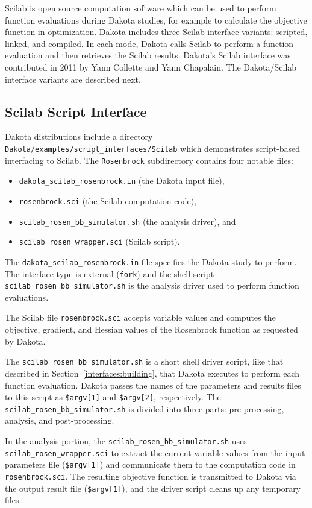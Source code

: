 Scilab is open source computation software which can be used to
perform function evaluations during Dakota studies, for example to
calculate the objective function in optimization. Dakota includes
three Scilab interface variants: scripted, linked, and compiled. In
each mode, Dakota calls Scilab to perform a function evaluation and
then retrieves the Scilab results. Dakota's Scilab interface was
contributed in 2011 by Yann Collette and Yann Chapalain. The
Dakota/Scilab interface variants are described next.

\subsection{Scilab Script Interface} 

Dakota distributions include a directory
\texttt{Dakota/examples/script\_interfaces/Scilab} which demonstrates
script-based interfacing to Scilab. The {\tt Rosenbrock} subdirectory
contains four notable files:
\begin{itemize}
  \item \texttt{dakota\_scilab\_rosenbrock.in} (the Dakota input file),
  \item \texttt{rosenbrock.sci} (the Scilab computation code),
  \item \texttt{scilab\_rosen\_bb\_simulator.sh} (the analysis driver), and
  \item \texttt{scilab\_rosen\_wrapper.sci} (Scilab script).
\end{itemize}

The \texttt{dakota\_scilab\_rosenbrock.in} file specifies the Dakota
study to perform. The interface type is external ({\tt fork}) and the
shell script \texttt{scilab\_rosen\_bb\_simulator.sh} is the analysis
driver used to perform function evaluations.

The Scilab file \texttt{rosenbrock.sci} accepts variable values and
computes the objective, gradient, and Hessian values of the Rosenbrock
function as requested by Dakota.

The \texttt{scilab\_rosen\_bb\_simulator.sh} is a short shell driver
script, like that described in Section~\ref{interfaces:building}, that
Dakota executes to perform each function evaluation. Dakota passes
the names of the parameters and results files to this script as
\texttt{\$argv[1]} and \texttt{\$argv[2]}, respectively. The
\texttt{scilab\_rosen\_bb\_simulator.sh} is divided into three parts:
pre-processing, analysis, and post-processing.

In the analysis portion, the \texttt{scilab\_rosen\_bb\_simulator.sh}
uses \texttt{scilab\_rosen\_wrapper.sci} to extract the current
variable values from the input parameters file (\texttt{\$argv[1]})
and communicate them to the computation code in
\texttt{rosenbrock.sci}. The resulting objective function is
transmitted to Dakota via the output result file (\texttt{\$argv[1]}),
and the driver script cleans up any temporary files.

